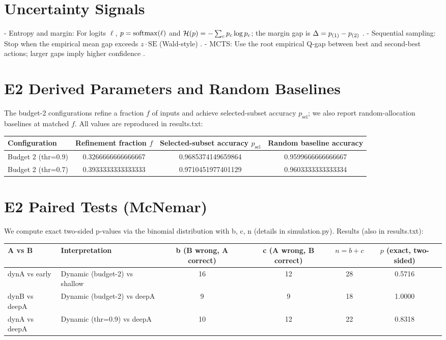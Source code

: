 \appendix

\section{Uncertainty Signals}
\label{app:uncertainty}
- Entropy and margin: For logits $\ell$, $p=\mathrm{softmax}(\ell)$ and $\mathcal{H}(p)=-\sum_c p_c \log p_c$; the margin gap is $\Delta = p_{(1)}-p_{(2)}$ \cite{Guo2017Calibration,Kaya2019ShallowDeep}.
- Sequential sampling: Stop when the empirical mean gap exceeds $z \cdot \mathrm{SE}$ (Wald-style) \cite{Wald1945Sequential,Hoeffding1963}.
- MCTS: Use the root empirical Q-gap between best and second-best actions; larger gaps imply higher confidence \cite{Kocsis2006UCT,Coulom2006MCTS}.

\section{E2 Derived Parameters and Random Baselines}
\label{app:derived}
The budget-2 configurations refine a fraction $f$ of inputs and achieve selected-subset accuracy $p_{\mathrm{sel}}$; we also report random-allocation baselines at matched $f$. All values are reproduced in results.txt:
\begin{center}
\begin{adjustbox}{width=\linewidth}
\begin{tabular}{l c c c}
\toprule
Configuration & Refinement fraction $f$ & Selected-subset accuracy $p_{\mathrm{sel}}$ & Random baseline accuracy \\
\midrule
Budget 2 (thr=0.9) & 0.3266666666666667 & 0.9685374149659864 & 0.9599666666666667 \\
Budget 2 (thr=0.7) & 0.3933333333333333 & 0.9710451977401129 & 0.9603333333333334 \\
\bottomrule
\end{tabular}
\end{adjustbox}
\end{center}

\section{E2 Paired Tests (McNemar)}
We compute exact two-sided p-values via the binomial distribution with b, c, n (details in simulation.py). Results (also in results.txt):
\begin{center}
\begin{adjustbox}{width=\linewidth}
\begin{tabular}{l l c c c c}
\toprule
A vs B & Interpretation & b (B wrong, A correct) & c (A wrong, B correct) & $n=b+c$ & $p$ (exact, two-sided) \\
\midrule
dynA vs early & Dynamic (budget-2) vs shallow & 16 & 12 & 28 & 0.5716 \\
dynB vs deepA & Dynamic (budget-2) vs deepA    & 9  & 9  & 18 & 1.0000 \\
dynA vs deepA & Dynamic (thr=0.9) vs deepA     & 10 & 12 & 22 & 0.8318 \\
\bottomrule
\end{tabular}
\end{adjustbox}
\end{center}

